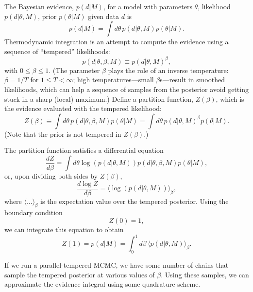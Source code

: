 \documentclass{article}
\begin{document}
The Bayesian evidence, $p(d|M)$, for a model with parameters $\theta$,
likelihood $p(d|\theta,M)$, prior $p(\theta|M)$ given data $d$ is
\begin{equation}
  p(d|M) = \int d\theta\, p(d|\theta,M) p(\theta|M).
\end{equation}
Thermodynamic integration is an attempt to compute the evidence using
a sequence of ``tempered'' likelihoods: 
\begin{equation}
  p(d|\theta,\beta,M) \equiv p(d|\theta,M)^\beta,
\end{equation}
with $0 \leq \beta \leq 1$.  (The parameter $\beta$ plays the role of
an inverse temperature: $\beta = 1/T$ for $1 \leq T < \infty$; high
temperatures---small $\beta$s---result in smoothed likelihoods, which
can help a sequence of samples from the posterior avoid getting stuck
in a sharp (local) maximum.)  Define a partition function, $Z(\beta)$,
which is the evidence evaluated with the tempered likelihood:
\begin{equation}
  Z(\beta) \equiv \int d\theta\, p(d|\theta,\beta,M) p(\theta|M) =
  \int d\theta\, p(d|\theta,M)^\beta p(\theta|M).
\end{equation}
(Note that the prior is not tempered in $Z(\beta)$.)

The partition function satisfies a differential equation 
\begin{equation}
  \frac{dZ}{d\beta} = \int d\theta \log(p(d|\theta,M))
  p(d|\theta,\beta,M) p(\theta|M),
\end{equation}
or, upon dividing both sides by $Z(\beta)$,
\begin{equation}
  \frac{d\log Z}{d\beta} = \langle \log(p(d|\theta,M)) \rangle_\beta,
\end{equation}
where $\langle \ldots \rangle_\beta$ is the expectation value over the
tempered posterior.  Using the boundary condition
\begin{equation}
  Z(0) = 1,
\end{equation}
we can integrate this equation to obtain 
\begin{equation}
  Z(1) = p(d|M) = \int_0^1 d\beta\, \langle p(d|\theta,M) \rangle_\beta.
\end{equation}

If we run a parallel-tempered MCMC, we have some number of chains that
sample the tempered posterior at various values of $\beta$.  Using
these samples, we can approximate the evidence integral using some
quadrature scheme.  
\end{document}
